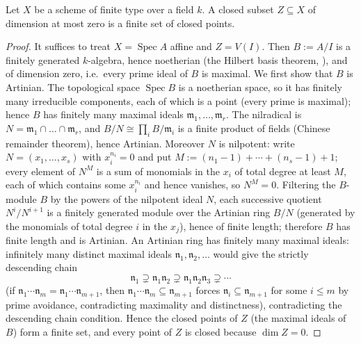 \begin{lemma}
\label{lem:pcb-dim0-finite}
Let \(X\) be a scheme of finite type over a field \(k\).  A closed
subset \(Z\subseteq X\) of dimension at most zero is a finite set of
closed points.
\end{lemma}
\begin{proof}
It suffices to treat \(X=\operatorname{Spec}A\) affine and
\(Z=V(I)\).  Then \(B:=A/I\) is a finitely generated \(k\)-algebra,
hence noetherian (the Hilbert basis theorem,
), and of dimension zero,
i.e.\ every prime ideal of \(B\) is maximal.  We first show that
\(B\) is Artinian.  The topological space \(\operatorname{Spec}B\)
is a noetherian space, so it has finitely many irreducible
components, each of which is a point (every prime is maximal);
hence \(B\) has finitely many maximal ideals
\(\mathfrak m_1,\dots,\mathfrak m_r\).  The nilradical is
\(N=\mathfrak m_1\cap\dots\cap\mathfrak m_r\), and
\(B/N\cong\prod_iB/\mathfrak m_i\) is a finite product of fields
(Chinese remainder theorem), hence Artinian.  Moreover \(N\) is
nilpotent: write \(N=(x_1,\dots,x_s)\) with \(x_i^{n_i}=0\) and put
\(M:=(n_1-1)+\cdots+(n_s-1)+1\); every element of \(N^M\) is a sum
of monomials in the \(x_i\) of total degree at least \(M\), each of
which contains some \(x_i^{n_i}\) and hence vanishes, so \(N^M=0\).
Filtering the \(B\)-module \(B\) by the powers of the nilpotent
ideal \(N\), each successive quotient \(N^i/N^{i+1}\) is a finitely
generated module over the Artinian ring \(B/N\) (generated by the
monomials of total degree \(i\) in the \(x_j\)), hence of finite
length; therefore \(B\) has finite length and is Artinian.  An
Artinian ring has finitely many maximal ideals: infinitely many
distinct maximal ideals \(\mathfrak n_1,\mathfrak n_2,\dots\) would
give the strictly descending chain
\[
 \mathfrak n_1\supsetneq\mathfrak n_1\mathfrak n_2\supsetneq
 \mathfrak n_1\mathfrak n_2\mathfrak n_3\supsetneq\cdots
\]
(if \(\mathfrak n_1\cdots\mathfrak n_m=\mathfrak n_1\cdots\mathfrak
n_{m+1}\), then \(\mathfrak n_1\cdots\mathfrak n_m\subseteq\mathfrak
n_{m+1}\) forces \(\mathfrak n_i\subseteq\mathfrak n_{m+1}\) for
some \(i\leq m\) by prime avoidance, contradicting maximality and
distinctness), contradicting the descending chain condition.  Hence
the closed points of \(Z\) (the maximal ideals of \(B\)) form a
finite set, and every point of \(Z\) is closed because
\(\dim Z=0\).
\end{proof}

